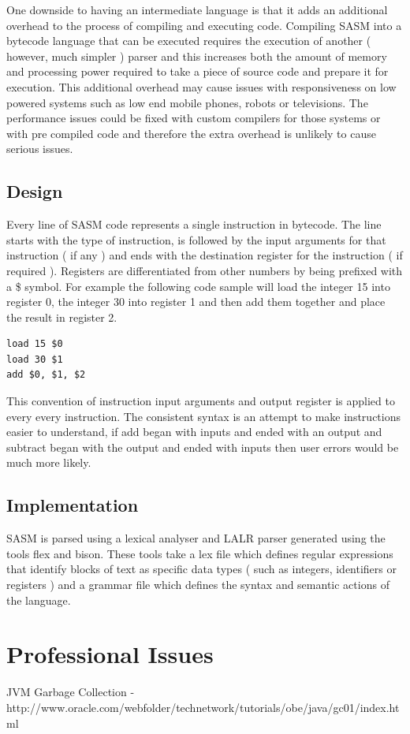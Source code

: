 \documentclass[]{final_report}
\begin{document}
One downside to having an intermediate language is that it adds an additional overhead to the process of compiling and executing code. Compiling SASM into a bytecode language that can be executed requires the execution of another ( however, much simpler ) parser and this increases both the amount of memory and processing power required to take a piece of source code and prepare it for execution. This additional overhead may cause issues with responsiveness on low powered systems such as low end mobile phones, robots or televisions. The performance issues could be fixed with custom compilers for those systems or with pre compiled code and therefore the extra overhead is unlikely to cause serious issues.

\section{Design}

Every line of SASM code represents a single instruction in bytecode. The line starts with the type of instruction, is followed by the input arguments for that instruction ( if any ) and ends with the destination register for the instruction ( if required ). Registers are differentiated from other numbers by being prefixed with a \$ symbol. For example the following code sample will load the integer 15 into register 0, the integer 30 into register 1 and then add them together and place the result in register 2.

\begin{verbatim}
load 15 $0
load 30 $1
add $0, $1, $2
\end{verbatim}

This convention of instruction input arguments and output register is applied to every every instruction. The consistent syntax is an attempt to make instructions easier to understand, if add began with inputs and ended with an output and subtract began with the output and ended with inputs then user errors would be much more likely.



\section{Implementation}

SASM is parsed using a lexical analyser and LALR parser generated using the tools flex and bison. These tools take a lex file which defines regular expressions that identify blocks of text as specific data types ( such as integers, identifiers or registers ) and a grammar file which defines the syntax and semantic actions of the language.

\chapter{Professional Issues}

\newpage
\begin{thebibliography}{99}
JVM Garbage Collection - http://www.oracle.com/webfolder/technetwork/tutorials/obe/java/gc01/index.html
\end{thebibliography}
\label{endpage}
\end{document}
